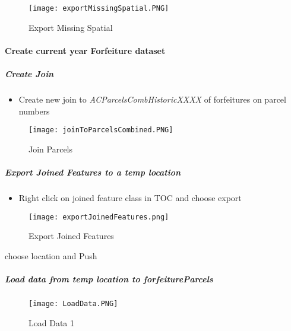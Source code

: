  
 \begin{figure}[h!]
 \centering
     \texttt{[image: exportMissingSpatial.PNG]}
 \caption{Export Missing Spatial}
 \end{figure}
 
 \clearpage
   
\paragraph{Create current year Forfeiture dataset}
 \subparagraph{Create Join}
 \vspace{.3in}

\begin{itemize}

\item{Create new join to \emph{ACParcelsCombHistoricXXXX} of forfeitures on parcel numbers}

\end{itemize}

 \vspace{.25in}

 \begin{figure}[h!]
 \centering
     \texttt{[image: joinToParcelsCombined.PNG]}
 \caption{Join Parcels}
 \end{figure}
 \clearpage
 \subparagraph[Export Joined Features]{Export Joined Features to a temp location \texorpdfstring{\\}{}}
 \begin{itemize}
 \item Right click {{\rtArrow}}  on joined feature class in TOC and choose export
\end{itemize}
 \begin{figure}[h!]
 \centering
     \texttt{[image: exportJoinedFeatures.png]}
 \caption{Export Joined Features}
 \end{figure}
 {\bigbtn choose location and Push }
 \clearpage
 \subparagraph[Load data to forfeitureParcels]{\Large Load data from temp location to forfeitureParcels}
 \begin{figure}[h!]
 \centering
     \texttt{[image: LoadData.PNG]}
 \caption{Load Data 1}
 \end{figure}
 

